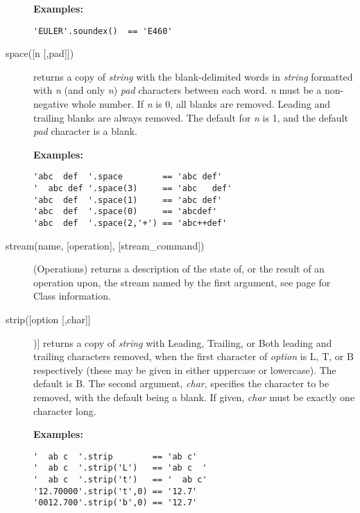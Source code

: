 \begin{description}
\textbf{Examples:}
\begin{lstlisting}
'EULER'.soundex()  == 'E460'
\end{lstlisting}

\item[space([n [,pad{]]})]\label{refspace}
returns a copy of \emph{string} with the blank-delimited words in
\emph{string} formatted with \emph{n} (and only \emph{n})
\emph{pad} characters between each word.
\emph{n} must be a non-negative whole number.
If \emph{n} is 0, all blanks are removed.
Leading and trailing blanks are always removed.
The default for \emph{n} is 1, and the default \emph{pad}
character is a blank.
 
\textbf{Examples:}
\begin{lstlisting}
'abc  def  '.space        == 'abc def'
'  abc def '.space(3)     == 'abc   def'
'abc  def  '.space(1)     == 'abc def'
'abc  def  '.space(0)     == 'abcdef'
'abc  def  '.space(2,'+') == 'abc++def'
\end{lstlisting}

\item[stream(name, [operation{]}, [stream\_command{]})] (Operations)
  returns a description of the state of, or the result of an operation upon, the stream named by the first argument, see page \pageref{refrexxstream} for Class  information.

  
\item[strip([option [,char{]]}])]\label{refstrip}
returns a copy of \emph{string} with Leading, Trailing, or Both
leading and trailing characters removed, when the first character of
\emph{option} is L, T, or B respectively (these may be given in
either uppercase or lowercase).  The default is B.
The second argument, \emph{char}, specifies the character to be
removed, with the default being a blank.
If given, \emph{char} must be exactly one character long.
 
\textbf{Examples:}
\begin{lstlisting}
'  ab c  '.strip        == 'ab c'
'  ab c  '.strip('L')   == 'ab c  '
'  ab c  '.strip('t')   == '  ab c'
'12.70000'.strip('t',0) == '12.7'
'0012.700'.strip('b',0) == '12.7'
\end{lstlisting}


\end{description}
